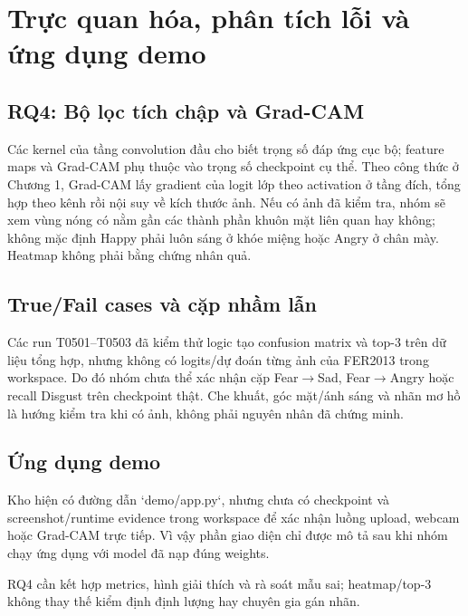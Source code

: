\chapter{Trực quan hóa, phân tích lỗi và ứng dụng demo}
\section{RQ4: Bộ lọc tích chập và Grad-CAM}
Các kernel của tầng convolution đầu cho biết trọng số đáp ứng cục bộ; feature maps và Grad-CAM phụ thuộc vào trọng số checkpoint cụ thể. Theo công thức ở Chương 1, Grad-CAM lấy gradient của logit lớp theo activation ở tầng đích, tổng hợp theo kênh rồi nội suy về kích thước ảnh. Nếu có ảnh đã kiểm tra, nhóm sẽ xem vùng nóng có nằm gần các thành phần khuôn mặt liên quan hay không; không mặc định Happy phải luôn sáng ở khóe miệng hoặc Angry ở chân mày. Heatmap không phải bằng chứng nhân quả.

\section{True/Fail cases và cặp nhầm lẫn}
Các run T0501--T0503 đã kiểm thử logic tạo confusion matrix và top-3 trên dữ liệu tổng hợp, nhưng không có logits/dự đoán từng ảnh của FER2013 trong workspace. Do đó nhóm chưa thể xác nhận cặp Fear\ensuremath{\rightarrow}Sad, Fear\ensuremath{\rightarrow}Angry hoặc recall Disgust trên checkpoint thật. Che khuất, góc mặt/ánh sáng và nhãn mơ hồ là hướng kiểm tra khi có ảnh, không phải nguyên nhân đã chứng minh.

\section{Ứng dụng demo}
Kho hiện có đường dẫn `demo/app.py`, nhưng chưa có checkpoint và screenshot/runtime evidence trong workspace để xác nhận luồng upload, webcam hoặc Grad-CAM trực tiếp. Vì vậy phần giao diện chỉ được mô tả sau khi nhóm chạy ứng dụng với model đã nạp đúng weights.

\begin{calloutbox}
RQ4 cần kết hợp metrics, hình giải thích và rà soát mẫu sai; heatmap/top-3 không thay thế kiểm định định lượng hay chuyên gia gán nhãn.
\end{calloutbox}